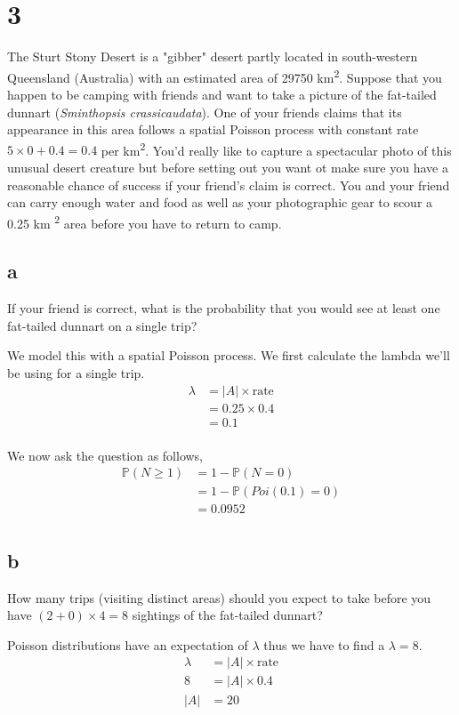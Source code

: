 \documentclass{article}
\newcommand{\prob}{\mathbb{P}}
\begin{document}
\section{3}
The Sturt Stony Desert is a "gibber" desert partly located in south-western
Queensland (Australia) with an estimated area of 29750 km\textsuperscript{2}.
Suppose that you happen to be camping with friends and want to take a picture of
the fat-tailed dunnart (\textit{Sminthopsis crassicaudata}). One of your friends
claims that its appearance in this area follows a spatial Poisson process with
constant rate $5 \times 0 + 0.4 = 0.4$ per km\textsuperscript{2}.
You'd really like to capture a spectacular photo of this unusual desert
creature but before setting out you want ot make sure you have a reasonable
chance of success if your friend's claim is correct. You and your friend can
carry enough water and food as well as your photographic gear to scour a 0.25 km
\textsuperscript{2} area before you have to return to camp.

\subsection{a}
If your friend is correct, what is the probability that you would see at least
one fat-tailed dunnart on a single trip?

We model this with a spatial Poisson process. We first calculate the lambda
we'll be using for a single trip.
\begin{align*}
    \lambda &= |A| \times \text{rate} \\
    &= 0.25 \times 0.4 \\
    &= 0.1 \\
\end{align*}

We now ask the question as follows,
\begin{align*}
    \prob(N \geq 1) &= 1 - \prob(N = 0) \\
    &= 1 - \prob(Poi(0.1) = 0) \\
    &= 0.0952 \\
\end{align*}

\subsection{b}
How many trips (visiting distinct areas) should you expect to take before you
have $(2 + 0) \times 4 = 8$ sightings of the fat-tailed dunnart?

Poisson distributions have an expectation of $\lambda$ thus we have to find a
$\lambda = 8$.
\begin{align*}
    \lambda &= |A| \times \text{rate} \\
    8 &= |A| \times 0.4 \\
    |A| &= 20 \\
\end{align*}
\end{document}
